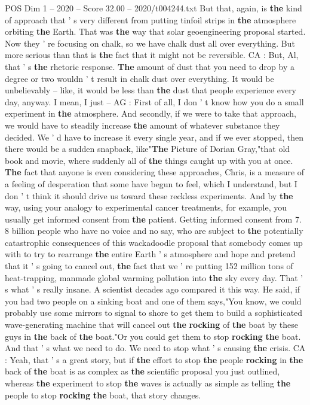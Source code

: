 \begin{textsample}{POS Dim 1 – 2020 – Score 32.00 – 2020/t004244.txt}
But that, again, is \textbf{the} kind of approach that ' s very different from putting tinfoil strips in \textbf{the} atmosphere orbiting \textbf{the} Earth.
That was \textbf{the} way that solar geoengineering proposal started.
Now they ' re focusing on chalk, so we have chalk dust all over everything.
But more serious than that is \textbf{the} fact that it might not be reversible.
CA : But, Al, that ' s \textbf{the} rhetoric response. \textbf{The} amount of dust that you need to drop by a degree or two wouldn ' t result in chalk dust over everything.
It would be unbelievably -- like, it would be less than \textbf{the} dust that people experience every day, anyway.
I mean, I just -- AG : First of all, I don ' t know how you do a small experiment in \textbf{the} atmosphere.
And secondly, if we were to take that approach, we would have to steadily increase \textbf{the} amount of whatever substance they decided.
We ' d have to increase it every single year, and if we ever stopped, then there would be a sudden snapback, like"\textbf{The} Picture of Dorian Gray,"that old book and movie, where suddenly all of \textbf{the} things caught up with you at once. \textbf{The} fact that anyone is even considering these approaches, Chris, is a measure of a feeling of desperation that some have begun to feel, which I understand, but I don ' t think it should drive us toward these reckless experiments.
And by \textbf{the} way, using your analogy to experimental cancer treatments, for example, you usually get informed consent from \textbf{the} patient.
Getting informed consent from 7. 8 billion people who have no voice and no say, who are subject to \textbf{the} potentially catastrophic consequences of this wackadoodle proposal that somebody comes up with to try to rearrange \textbf{the} entire Earth ' s atmosphere and hope and pretend that it ' s going to cancel out, \textbf{the} fact that we ' re putting 152 million tons of heat-trapping, manmade global warming pollution into \textbf{the} sky every day.
That ' s what ' s really insane.
A scientist decades ago compared it this way.
He said, if you had two people on a sinking boat and one of them says,"You know, we could probably use some mirrors to signal to shore to get them to build a sophisticated wave-generating machine that will cancel out \textbf{the} \textbf{rocking} of \textbf{the} boat by these guys in \textbf{the} back of \textbf{the} boat."Or you could get them to stop \textbf{rocking} \textbf{the} boat.
And that ' s what we need to do.
We need to stop what ' s causing \textbf{the} crisis.
CA : Yeah, that ' s a great story, but if \textbf{the} effort to stop \textbf{the} people \textbf{rocking} in \textbf{the} back of \textbf{the} boat is as complex as \textbf{the} scientific proposal you just outlined, whereas \textbf{the} experiment to stop \textbf{the} waves is actually as simple as telling \textbf{the} people to stop \textbf{rocking} \textbf{the} boat, that story changes.

\end{textsample}
